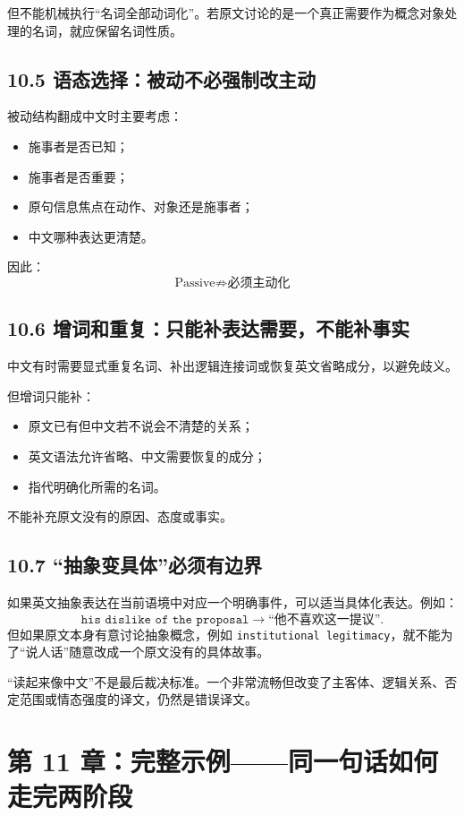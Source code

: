 \documentclass[11pt,a4paper]{ctexart}
\begin{document}
但不能机械执行“名词全部动词化”。若原文讨论的是一个真正需要作为概念对象处理的名词，就应保留名词性质。

\subsection{10.5 语态选择：被动不必强制改主动}
被动结构翻成中文时主要考虑：
\begin{itemize}
  \item 施事者是否已知；
  \item 施事者是否重要；
  \item 原句信息焦点在动作、对象还是施事者；
  \item 中文哪种表达更清楚。
\end{itemize}

因此：
\[
\boxed{\text{Passive} \not\Rightarrow \text{必须主动化}}
\]

\subsection{10.6 增词和重复：只能补表达需要，不能补事实}
中文有时需要显式重复名词、补出逻辑连接词或恢复英文省略成分，以避免歧义。

但增词只能补：
\begin{itemize}
  \item 原文已有但中文若不说会不清楚的关系；
  \item 英文语法允许省略、中文需要恢复的成分；
  \item 指代明确化所需的名词。
\end{itemize}
不能补充原文没有的原因、态度或事实。

\subsection{10.7 “抽象变具体”必须有边界}
如果英文抽象表达在当前语境中对应一个明确事件，可以适当具体化表达。例如：
\[
\texttt{his dislike of the proposal}
\rightarrow
\text{“他不喜欢这一提议”}.
\]
但如果原文本身有意讨论抽象概念，例如 \texttt{institutional legitimacy}，就不能为了“说人话”随意改成一个原文没有的具体故事。

\begin{warn}[中文自然不能高于意义准确]
“读起来像中文”不是最后裁决标准。一个非常流畅但改变了主客体、逻辑关系、否定范围或情态强度的译文，仍然是错误译文。
\end{warn}

\section{第 11 章：完整示例——同一句话如何走完两阶段}
\end{document}
